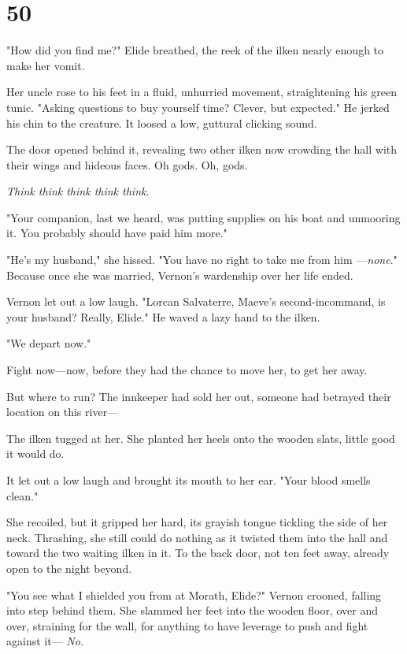 
\chapter{50}

"How did you find me?"
Elide breathed, the reek of the ilken nearly enough to make her vomit.

Her uncle rose to his feet in a fluid, unhurried movement, straightening his green tunic.
"Asking questions to buy yourself time?
Clever, but expected."
He jerked his chin to the creature.
It loosed a low, guttural clicking sound.

The door opened behind it, revealing two other ilken now crowding the hall with their wings and hideous faces.
Oh gods.
Oh, gods.

\emph{Think think think think think}.

"Your companion, last we heard, was putting supplies on his boat and unmooring it.
You probably should have paid him more."

"He's my husband," she hissed.
"You have no right to take me from him ---\emph{none}."
Because once she was married, Vernon's wardenship over her life ended.

Vernon let out a low laugh.
"Lorcan Salvaterre, Maeve's second-incommand, is your husband?
Really, Elide."
He waved a lazy hand to the ilken.

"We depart now."

Fight now---now, before they had the chance to move her, to get her away.

But where to run?
The innkeeper had sold her out, someone had betrayed their location on this river---

The ilken tugged at her.
She planted her heels onto the wooden slats, little good it would do.

It let out a low laugh and brought its mouth to her ear.
"Your blood smells clean."

She recoiled, but it gripped her hard, its grayish tongue tickling the side of her neck.
Thrashing, she still could do nothing as it twisted them into the hall and toward the two waiting ilken in it.
To the back door, not ten feet away, already open to the night beyond.

"You see what I shielded you from at Morath, Elide?"
Vernon crooned, falling into step behind them.
She slammed her feet into the wooden floor, over and over, straining for the wall, for anything to have leverage to push and fight against it--- \emph{No.}

